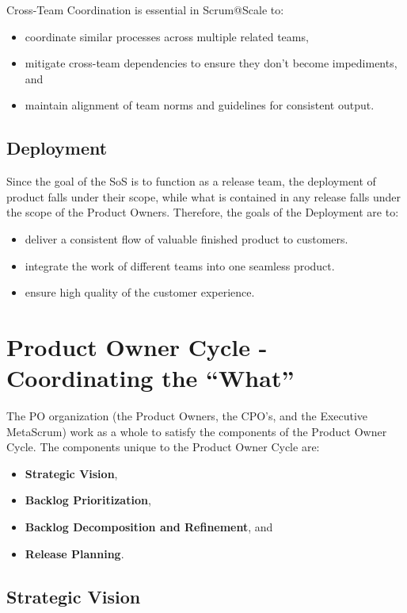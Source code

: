 \documentclass[12pt,a4paper,parskip=full]{scrartcl}
\begin{document}
Cross-Team Coordination is essential in Scrum@Scale to:

\begin{itemize}
	\item coordinate similar processes across multiple related teams,
	\item mitigate cross-team dependencies to ensure they don't become impediments, and 
	\item maintain alignment of team norms and guidelines for consistent output.
\end{itemize}

\subsection{Deployment}

Since the goal of the SoS is to function as a release team, the deployment of product falls under their scope, while what is contained in any release falls under the scope of the Product Owners. Therefore, the goals of the Deployment are to:

\begin{itemize}
	\item deliver a consistent flow of valuable finished product to customers.
	\item integrate the work of different teams into one seamless product.
	\item ensure high quality of the customer experience.
\end{itemize}

\section{Product Owner Cycle - Coordinating the ``What''}

The PO organization (the Product Owners, the CPO's, and the Executive MetaScrum) work as a whole to satisfy the components of the Product Owner Cycle. The components unique to the Product Owner Cycle are:
\begin{itemize}
	\item \textbf{Strategic Vision},
	\item \textbf{Backlog Prioritization},
	\item \textbf{Backlog Decomposition and Refinement}, and
	\item \textbf{Release Planning}.
\end{itemize}

\subsection{Strategic Vision}
\end{document}
